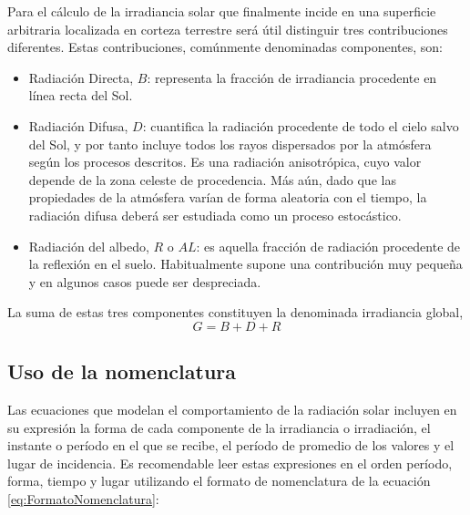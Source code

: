 Para el cálculo de la irradiancia solar que finalmente incide en una
superficie arbitraria localizada en corteza terrestre será útil distinguir
tres contribuciones diferentes. Estas contribuciones, comúnmente denominadas
componentes, son:
\begin{itemize}
\item Radiación Directa, $B$: representa la fracción de irradiancia procedente
en línea recta del Sol.
\item Radiación Difusa, $D$: cuantifica la radiación procedente de todo
el cielo salvo del Sol, y por tanto incluye todos los rayos dispersados
por la atmósfera según los procesos descritos. Es una radiación anisotrópica,
cuyo valor depende de la zona celeste de procedencia. Más aún, dado
que las propiedades de la atmósfera varían de forma aleatoria con
el tiempo, la radiación difusa deberá ser estudiada como un proceso
estocástico.
\item Radiación del albedo, $R$ o $AL$:
es aquella fracción de radiación procedente de la reflexión en el
suelo. Habitualmente supone una contribución muy pequeña y en algunos
casos puede ser despreciada.
\end{itemize}
La suma de estas tres componentes constituyen la denominada irradiancia
global, \begin{equation}
G=B+D+R\end{equation}


\subsection{Uso de la nomenclatura}

Las ecuaciones que modelan el comportamiento de la radiación solar
incluyen en su expresión la forma de cada componente de la irradiancia
o irradiación, el instante o período en el que se recibe, el período
de promedio de los valores y el lugar de incidencia. Es recomendable
leer estas expresiones en el orden período, forma, tiempo y lugar
utilizando el formato de nomenclatura de la ecuación \ref{eq:FormatoNomenclatura}:

